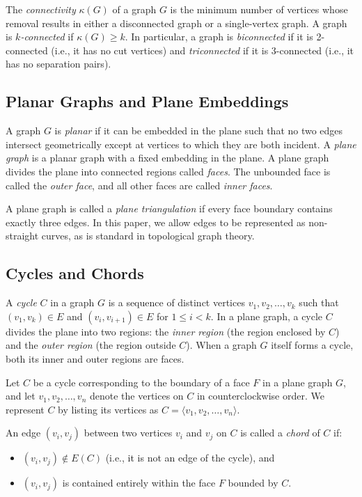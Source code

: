 \documentclass[12pt,a4paper]{article}
\theoremstyle{definition}
\theoremstyle{remark}
\begin{document}
The \emph{connectivity} $\kappa(G)$ of a graph $G$ is the minimum number of vertices whose removal results in either a disconnected graph or a single-vertex graph. A graph is \emph{$k$-connected} if $\kappa(G) \geq k$. In particular, a graph is \emph{biconnected} if it is 2-connected (i.e., it has no cut vertices) and \emph{triconnected} if it is 3-connected (i.e., it has no separation pairs).

\subsection{Planar Graphs and Plane Embeddings}

A graph $G$ is \emph{planar} if it can be embedded in the plane such that no two edges intersect geometrically except at vertices to which they are both incident. A \emph{plane graph} is a planar graph with a fixed embedding in the plane. A plane graph divides the plane into connected regions called \emph{faces}. The unbounded face is called the \emph{outer face}, and all other faces are called \emph{inner faces}. 

A plane graph is called a \emph{plane triangulation} if every face boundary contains exactly three edges. In this paper, we allow edges to be represented as non-straight curves, as is standard in topological graph theory.

\subsection{Cycles and Chords}

A \emph{cycle} $C$ in a graph $G$ is a sequence of distinct vertices $v_1,v_2,\ldots,v_k$ such that $(v_1,v_k) \in E$ and $(v_i,v_{i+1}) \in E$ for $1 \leq i < k$. In a plane graph, a cycle $C$ divides the plane into two regions: the \emph{inner region} (the region enclosed by $C$) and the \emph{outer region} (the region outside $C$). When a graph $G$ itself forms a cycle, both its inner and outer regions are faces.

Let $C$ be a cycle corresponding to the boundary of a face $F$ in a plane graph $G$, and let $v_1, v_2, \ldots, v_n$ denote the vertices on $C$ in counterclockwise order. We represent $C$ by listing its vertices as $C = \langle v_1,v_2,\ldots,v_n \rangle$. 

An edge $(v_i, v_j)$ between two vertices $v_i$ and $v_j$ on $C$ is called a \emph{chord} of $C$ if:
\begin{itemize}
    \item $(v_i,v_j) \notin E(C)$ (i.e., it is not an edge of the cycle), and
    \item $(v_i,v_j)$ is contained entirely within the face $F$ bounded by $C$.
\end{itemize}
\end{document}
